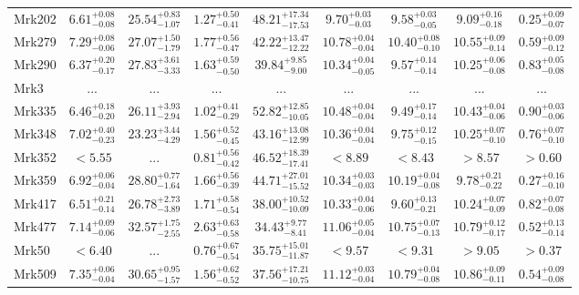 \documentclass[onecolumn]{mn2e}
\begin{document}
{\begin{center}
\begin{longtable}{lcccccccc}
Mrk202 & $6.61_{-0.08}^{+0.08}$ & $25.54_{-1.07}^{+0.83}$ & $1.27_{-0.41}^{+0.50}$ &$48.21_{-17.53}^{+17.34}$ & $9.70_{-0.03}^{+0.03}$ & $9.58_{-0.05}^{+0.03}$ & $9.09_{-0.18}^{+0.16}$ & $0.25_{-0.07}^{+0.09}$ \\
Mrk279 & $7.29_{-0.06}^{+0.08}$ & $27.07_{-1.79}^{+1.50}$ & $1.77_{-0.47}^{+0.56}$ &$42.22_{-12.22}^{+13.47}$ & $10.78_{-0.04}^{+0.04}$ & $10.40_{-0.10}^{+0.08}$ & $10.55_{-0.14}^{+0.09}$ & $0.59_{-0.12}^{+0.09}$ \\
Mrk290 & $6.37_{-0.17}^{+0.20}$ & $27.83_{-3.33}^{+3.61}$ & $1.63_{-0.50}^{+0.59}$ &$39.84_{-9.00}^{+9.85}$ & $10.34_{-0.05}^{+0.04}$ & $9.57_{-0.14}^{+0.14}$ & $10.25_{-0.08}^{+0.06}$ & $0.83_{-0.08}^{+0.05}$ \\
Mrk3 & ... & ... & ... &... & ... & ... & ... & ... \\
Mrk335 & $6.46_{-0.20}^{+0.18}$ & $26.11_{-2.94}^{+3.93}$ & $1.02_{-0.29}^{+0.41}$ &$52.82_{-10.05}^{+12.85}$ & $10.48_{-0.04}^{+0.04}$ & $9.49_{-0.14}^{+0.17}$ & $10.43_{-0.06}^{+0.04}$ & $0.90_{-0.06}^{+0.03}$ \\
Mrk348 & $7.02_{-0.23}^{+0.40}$ & $23.23_{-4.29}^{+3.44}$ & $1.56_{-0.45}^{+0.52}$ &$43.16_{-12.99}^{+13.08}$ & $10.36_{-0.04}^{+0.04}$ & $9.75_{-0.15}^{+0.12}$ & $10.25_{-0.10}^{+0.07}$ & $0.76_{-0.10}^{+0.07}$ \\
Mrk352 & $<5.55$ & ... & $0.81_{-0.42}^{+0.56}$ &$46.52_{-17.41}^{+18.39}$ & $<8.89$ & $<8.43$ & $>8.57$ & $>0.60$ \\
Mrk359 & $6.92_{-0.04}^{+0.06}$ & $28.80_{-1.64}^{+0.77}$ & $1.66_{-0.39}^{+0.56}$ &$44.71_{-15.52}^{+27.01}$ & $10.34_{-0.03}^{+0.03}$ & $10.19_{-0.08}^{+0.04}$ & $9.78_{-0.22}^{+0.21}$ & $0.27_{-0.10}^{+0.16}$ \\
Mrk417 & $6.51_{-0.14}^{+0.21}$ & $26.78_{-3.89}^{+2.73}$ & $1.71_{-0.54}^{+0.58}$ &$38.00_{-10.09}^{+10.52}$ & $10.33_{-0.06}^{+0.04}$ & $9.60_{-0.21}^{+0.13}$ & $10.24_{-0.09}^{+0.07}$ & $0.82_{-0.08}^{+0.07}$ \\
Mrk477 & $7.14_{-0.06}^{+0.09}$ & $32.57_{-2.55}^{+1.75}$ & $2.63_{-0.58}^{+0.63}$ &$34.43_{-8.41}^{+9.77}$ & $11.06_{-0.04}^{+0.05}$ & $10.75_{-0.13}^{+0.07}$ & $10.79_{-0.17}^{+0.12}$ & $0.52_{-0.14}^{+0.13}$ \\
Mrk50 & $<6.40$ & ... & $0.76_{-0.54}^{+0.67}$ &$35.75_{-11.87}^{+15.01}$ & $<9.57$ & $<9.31$ & $>9.05$ & $>0.37$ \\
Mrk509 & $7.35_{-0.04}^{+0.06}$ & $30.65_{-1.57}^{+0.95}$ & $1.56_{-0.52}^{+0.62}$ &$37.56_{-10.75}^{+17.21}$ & $11.12_{-0.04}^{+0.03}$ & $10.79_{-0.08}^{+0.04}$ & $10.86_{-0.11}^{+0.09}$ & $0.54_{-0.08}^{+0.09}$ \\

\end{longtable}
\end{center}}
\end{document}
